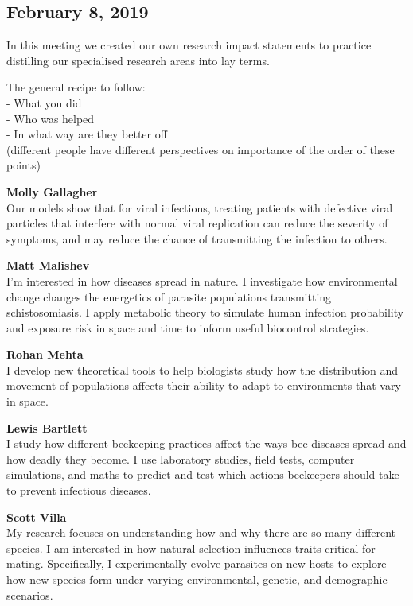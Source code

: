 \documentclass[10,portrait]{article}
\begin{document}
\newpage  

\subsection{February 8, 2019}\label{february-8-2019}

In this meeting we created our own research impact statements to
practice distilling our specialised research areas into lay terms.

The general recipe to follow:\\
- What you did\\
- Who was helped\\
- In what way are they better off\\
(different people have different perspectives on importance of the order
of these points)

\textbf{Molly Gallagher}\\
Our models show that for viral infections, treating patients with
defective viral particles that interfere with normal viral replication
can reduce the severity of symptoms, and may reduce the chance of
transmitting the infection to others.

\textbf{Matt Malishev}\\
I'm interested in how diseases spread in nature. I investigate how
environmental change changes the energetics of parasite populations
transmitting schistosomiasis. I apply metabolic theory to simulate human
infection probability and exposure risk in space and time to inform
useful biocontrol strategies.

\textbf{Rohan Mehta}\\
I develop new theoretical tools to help biologists study how the
distribution and movement of populations affects their ability to adapt
to environments that vary in space.

\textbf{Lewis Bartlett}\\
I study how different beekeeping practices affect the ways bee diseases
spread and how deadly they become. I use laboratory studies, field
tests, computer simulations, and maths to predict and test which actions
beekeepers should take to prevent infectious diseases.

\textbf{Scott Villa}\\
My research focuses on understanding how and why there are so many
different species. I am interested in how natural selection influences
traits critical for mating. Specifically, I experimentally evolve
parasites on new hosts to explore how new species form under varying
environmental, genetic, and demographic scenarios.
\end{document}
